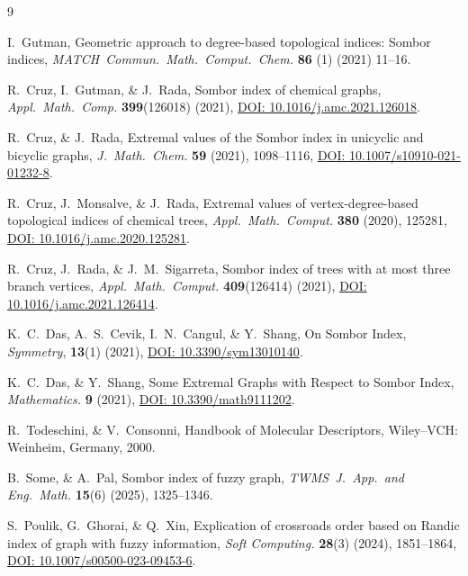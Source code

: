 \documentclass[12pt]{amsart}
\begin{document}
\begin{thebibliography}{9}

 I.~Gutman, Geometric approach to degree-based topological indices: Sombor indices, {\it MATCH~Commun.~Math.~Comput.~Chem.} \textbf{86} (1) (2021) 11--16.

 R.~Cruz, I.~Gutman, \& J.~Rada, Sombor index of chemical graphs, {\it Appl.~Math.~Comp.} \textbf{399}(126018) (2021), \href{https://doi.org/10.1016/j.amc.2021.126018}{DOI: 10.1016/j.amc.2021.126018}.

 R.~Cruz, \& J.~Rada, Extremal values of the Sombor index in unicyclic and bicyclic graphs, {\it J.~Math.~Chem.} \textbf{59} (2021), 1098--1116, \href{https://doi.org/10.1007/s10910-021-01232-8}{DOI: 10.1007/s10910-021-01232-8}.

 R.~Cruz, J.~Monsalve, \& J.~Rada, Extremal values of vertex-degree-based topological indices of chemical trees, {\it Appl.~Math.~Comput.} \textbf{380} (2020), 125281, \href{https://doi.org/10.1016/j.amc.2020.125281}{DOI: 10.1016/j.amc.2020.125281}.

R.~Cruz, J.~Rada, \& J.~M.~Sigarreta, Sombor index of trees with at most three branch vertices, {\it Appl.~Math.~Comput.} \textbf{409}(126414) (2021), \href{https://doi.org/10.1016/j.amc.2021.126414}{DOI: 10.1016/j.amc.2021.126414}. 


 K.~C.~Das, A.~S.~Cevik, I.~N.~Cangul, \& Y.~Shang, On Sombor Index, 
\emph{Symmetry},  \textbf{13}(1) (2021), \href{https://doi.org/10.3390/sym13010140}{DOI: 10.3390/sym13010140}. 

 K.~C.~Das, \& Y.~Shang, Some Extremal Graphs with Respect to Sombor Index, {\it Mathematics.} \textbf{9} (2021), \href{https://doi.org/10.3390/math9111202}{DOI: 10.3390/math9111202}.


 R.~Todeschini, \& V.~Consonni, Handbook of Molecular Descriptors, Wiley–VCH: Weinheim, Germany, 2000.

 B.~Some, \& A.~Pal, Sombor index of fuzzy graph, {\it TWMS~J.~App.~and Eng.~Math.} \textbf{15}(6) (2025), 1325--1346.

 S.~Poulik, G.~Ghorai, \& Q.~Xin, Explication of crossroads order based on Randic index of graph with fuzzy information,  {\it Soft Computing.} \textbf{28}(3) (2024), 1851--1864, \href{https://doi.org/10.1007/s00500-023-09453-6}{DOI: 10.1007/s00500-023-09453-6}.


\end{thebibliography}
\end{document}
